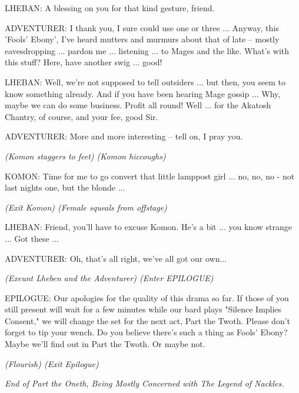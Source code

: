 LHEBAN: A blessing on you for that kind gesture, friend.

ADVENTURER: I thank you, I sure could use one or three ... Anyway, this 'Fools' Ebony', I've heard mutters and murmurs about that of late -- mostly eavesdropping ... pardon me ... listening ... to Mages and the like. What's with this stuff? Here, have another swig ... good!

LHEBAN: Well, we're not supposed to tell outsiders ... but then, you seem to know something already. And if you have been hearing Mage gossip ... Why, maybe we can do some business. Profit all round! Well ... for the Akatosh Chantry, of course, and your fee, good Sir.

ADVENTURER: More and more interesting -- tell on, I pray you.

\textit{(Komon staggers to feet) (Komon hiccoughs)}

KOMON: Time for me to go convert that little lamppost girl ... no, no, no - not last nights one, but the blonde ...

\textit{(Exit Komon) (Female squeals from offstage)}

LHEBAN: Friend, you'll have to excuse Komon. He's a bit ... you know strange ... Got these ...

ADVENTURER: Oh, that's all right, we've all got our own...

\textit{(Exeunt Lheben and the Adventurer) (Enter EPILOGUE)}

EPILOGUE: Our apologies for the quality of this drama so far. If those of you still present will wait for a few minutes while our bard plays "Silence Implies Consent," we will change the set for the next act, Part the Twoth. Please don't forget to tip your wench. Do you believe there's such a thing as Fools' Ebony? Maybe we'll find out in Part the Twoth. Or maybe not.

\textit{(Flourish) (Exit Epilogue)}

\textit{End of Part the Oneth, Being Mostly Concerned with The Legend of Nackles.}